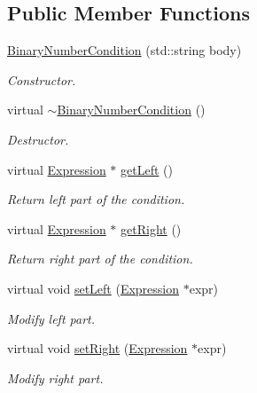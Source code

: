 \subsection*{Public Member Functions}
\begin{DoxyCompactItemize}
\item 
\hyperlink{class_binary_number_condition_ab54fbec3be222a1574adb747090997a4}{Binary\-Number\-Condition} (std\-::string body)
\begin{DoxyCompactList}\small\item\em Constructor. \end{DoxyCompactList}\item 
\hypertarget{class_binary_number_condition_afe174df27a6314b89627912fe548428f}{virtual \hyperlink{class_binary_number_condition_afe174df27a6314b89627912fe548428f}{$\sim$\-Binary\-Number\-Condition} ()}\label{class_binary_number_condition_afe174df27a6314b89627912fe548428f}

\begin{DoxyCompactList}\small\item\em Destructor. \end{DoxyCompactList}\item 
virtual \hyperlink{class_expression}{Expression} $\ast$ \hyperlink{class_binary_number_condition_a903313505a12530fd277a1c5a2d9c77d}{get\-Left} ()
\begin{DoxyCompactList}\small\item\em Return left part of the condition. \end{DoxyCompactList}\item 
virtual \hyperlink{class_expression}{Expression} $\ast$ \hyperlink{class_binary_number_condition_a80dbf32cdd93d3bbccdc23ed0a9c0fc2}{get\-Right} ()
\begin{DoxyCompactList}\small\item\em Return right part of the condition. \end{DoxyCompactList}\item 
virtual void \hyperlink{class_binary_number_condition_a1e58428de3f4a63f08b6fc2be66abcac}{set\-Left} (\hyperlink{class_expression}{Expression} $\ast$expr)
\begin{DoxyCompactList}\small\item\em Modify left part. \end{DoxyCompactList}\item 
virtual void \hyperlink{class_binary_number_condition_a1b5978f5a31338ec72fd32e83e34c5fd}{set\-Right} (\hyperlink{class_expression}{Expression} $\ast$expr)
\begin{DoxyCompactList}\small\item\em Modify right part. \end{DoxyCompactList}\end{DoxyCompactItemize}
